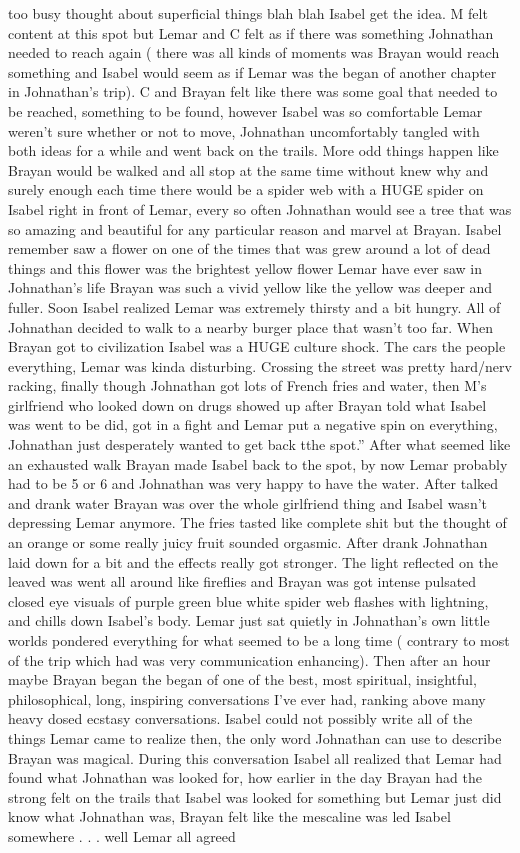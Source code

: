 \documentclass[12pt]{book}
\begin{document}
too busy thought about superficial things blah blah Isabel get the idea. M felt content at this spot but Lemar and C felt as if there was something Johnathan needed to reach again ( there was all kinds of moments was Brayan would reach something and Isabel would seem as if Lemar was the began of another chapter in Johnathan's trip). C and Brayan felt like there was some goal that needed to be reached, something to be found, however Isabel was so comfortable Lemar weren't sure whether or not to move, Johnathan uncomfortably tangled with both ideas for a while and went back on the trails. More odd things happen like Brayan would be walked and all stop at the same time without knew why and surely enough each time there would be a spider web with a HUGE spider on Isabel right in front of Lemar, every so often Johnathan would see a tree that was so amazing and beautiful for any particular reason and marvel at Brayan. Isabel remember saw a flower on one of the times that was grew around a lot of dead things and this flower was the brightest yellow flower Lemar have ever saw in Johnathan's life Brayan was such a vivid yellow like the yellow was deeper and fuller. Soon Isabel realized Lemar was extremely thirsty and a bit hungry. All of Johnathan decided to walk to a nearby burger place that wasn't too far. When Brayan got to civilization Isabel was a HUGE culture shock. The cars the people everything, Lemar was kinda disturbing. Crossing the street was pretty hard/nerv racking, finally though Johnathan got lots of French fries and water, then M's girlfriend who looked down on drugs showed up after Brayan told what Isabel was went to be did, got in a fight and Lemar put a negative spin on everything, Johnathan just desperately wanted to get back tthe spot.'' After what seemed like an exhausted walk Brayan made Isabel back to the spot, by now Lemar probably had to be 5 or 6 and Johnathan was very happy to have the water. After talked and drank water Brayan was over the whole girlfriend thing and Isabel wasn't depressing Lemar anymore. The fries tasted like complete shit but the thought of an orange or some really juicy fruit sounded orgasmic. After drank Johnathan laid down for a bit and the effects really got stronger. The light reflected on the leaved was went all around like fireflies and Brayan was got intense pulsated closed eye visuals of purple green blue white spider web flashes with lightning, and chills down Isabel's body. Lemar just sat quietly in Johnathan's own little worlds pondered everything for what seemed to be a long time ( contrary to most of the trip which had was very communication enhancing). Then after an hour maybe Brayan began the began of one of the best, most spiritual, insightful, philosophical, long, inspiring conversations I've ever had, ranking above many heavy dosed ecstasy conversations. Isabel could not possibly write all of the things Lemar came to realize then, the only word Johnathan can use to describe Brayan was magical. During this conversation Isabel all realized that Lemar had found what Johnathan was looked for, how earlier in the day Brayan had the strong felt on the trails that Isabel was looked for something but Lemar just did know what Johnathan was, Brayan felt like the mescaline was led Isabel somewhere . . .  well Lemar all agreed 
\end{document}
